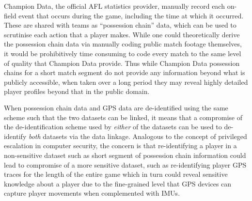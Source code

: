 




Champion Data, the official AFL statistics provider, manually record each on-field event that occurs during the game, including the time at which it occurred. These are shared with teams as ``possession chain'' data, which can be used to scrutinise each action that a player makes. While one could theoretically derive the possession chain data via manually coding public match footage themselves, it would be prohibitively time consuming to code every match to the same level of quality that Champion Data provide. Thus while Champion Data possession chains for a short match segment do not provide any information beyond what is publicly accessible, when taken over a long period they may reveal highly detailed player profiles beyond that in the public domain.

When possession chain data and GPS data are de-identified using the same scheme such that the two datasets can be linked, it means that a compromise of the de-identification scheme used by \textit{either} of the datasets can be used to de-identify \textit{both} datasets via the data linkage. Analogous to the concept of privileged escalation in computer security, the concern is that re-identifying a player in a non-sensitive dataset such as short segment of possession chain information could lead to compromise of a more sensitive dataset, such as re-identifying player GPS traces for the length of the entire game which in turn could reveal sensitive knowledge about a player due to the fine-grained level that GPS devices can capture player movements when complemented with IMUs.

